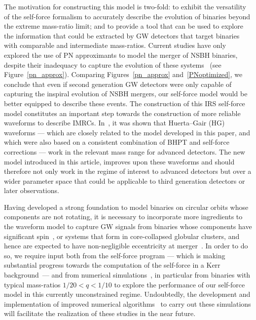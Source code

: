 \documentclass[aps,prd,showpacs,amssymb,floatfix,nofootinbib,superscriptaddress]{revtex4-1}%
\begin{document}
The motivation for constructing this model is two-fold: to exhibit the versatility of the self-force formalism to accurately describe the evolution of binaries beyond the extreme mass-ratio limit; and to provide a tool that can be used to explore the information that could be extracted by GW detectors that target binaries with comparable and intermediate mass-ratios. Current studies have only explored the use of PN approximants to model the merger of NSBH  binaries, despite their inadequacy to capture the evolution of these systems~\cite{Prayush:2013a,  pnbuo, Nitz:2013mxa} (see Figure~\ref{pn_approx}). Comparing  Figures~\ref{pn_approx} and~\ref{PNoptimized}, we conclude that even if second generation GW detectors were only capable of capturing the inspiral evolution of NSBH mergers, our self-force model would be better equipped to describe these events. The construction of this IRS self-force model constitutes an important step towards the construction of more reliable waveforms to describe  IMRCs. In~\cite{Smith:2013}, it was shown that Huerta--Gair (HG) waveforms --- which are closely related to the model developed in this paper, and which were also based on a consistent combination of BHPT and self-force corrections --- work in the relevant mass range for advanced detectors. The new model introduced in this article, improves upon these waveforms and should therefore not only work in the regime of interest to advanced detectors but over a wider parameter space that could be applicable to third generation detectors  or later observations.


Having developed a strong foundation to model binaries on circular orbits whose components are not rotating, it is necessary to incorporate more ingredients to the waveform model to capture GW signals from binaries whose components have significant spin~\cite{Foucart:2012, buho, maeda, burko, smallbody, buoerr1, buoII, TaylorT4Origin}, or systems that form in core-collapsed globular clusters, and hence are expected to have non-negligible eccentricity at merger~\cite{Leary:2009, Huerta:2013a}. In order to do so, we require input both from the self-force program --- which is making substantial progress towards the computation of the self-force in a Kerr background~\cite{Fan:2013b, Sam:2011,Pound:2013}--- and from numerical simulations~\cite{Mroue:2013}, in particular from binaries with typical mass-ratios \(1/20<q<1/10\) to explore the performance of our self-force model in this currently unconstrained regime. Undoubtedly, the development and implementation of improved numerical algorithms~\cite{Fan:2013a}  to carry out these simulations will facilitate the realization of these studies in the near future.
\end{document}
